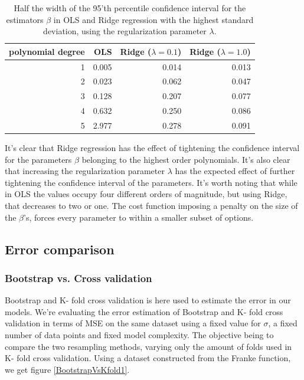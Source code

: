 \documentclass[11pt,a4paper,titlepage]{article}
\begin{document}
\begin{table}[H]\caption[Confidence interval of estimators in OLS vs. Ridge]{Half the width of the 95'th percentile confidence interval for the estimators $\beta$ in OLS and Ridge regression with the highest standard deviation, using the regularization parameter $\lambda$. }
\label{betaVarianceTable}
\begin{tabular}{|r|r|r|r|}
\hline
polynomial degree & OLS   & Ridge ($\lambda = 0.1$) & Ridge ($\lambda = 1.0$) \\ \hline
1                 & 0.005 & 0.014                & 0.013          \\
2                 & 0.023 & 0.062                & 0.047          \\
3                 & 0.128 & 0.207                & 0.077          \\
4                 & 0.632 & 0.250                & 0.086          \\
5                 & 2.977 & 0.278                & 0.091 \\ \hline
\end{tabular}
\end{table}
It's clear that Ridge regression has the effect of tightening the confidence interval for the parameters $\beta$ belonging to the highest order polynomials. It's also clear that increasing the regularization parameter $\lambda$ has the expected effect of further tightening the confidence interval of the parameters. It's worth noting that while in OLS the values occupy four different orders of magnitude, but using Ridge, that decreases to two or one. The cost function imposing a penalty on the size of the $\beta$'s, forces every parameter to within a smaller subset of options.

\subsection{Error comparison}
\subsubsection{Bootstrap vs. Cross validation}
Bootstrap and K- fold cross validation is here used to estimate the error in our models. We're evaluating the error estimation of Bootstrap and K- fold cross validation in terms of MSE on the same dataset using a fixed value for $\sigma$, a fixed number of data points and fixed model complexity. The objective being to compare the two resampling methods, varying only the amount of folds used in K- fold cross validation. Using a dataset constructed from the Franke function, we get figure \ref{BootstrapVsKfold1}.
\end{document}

